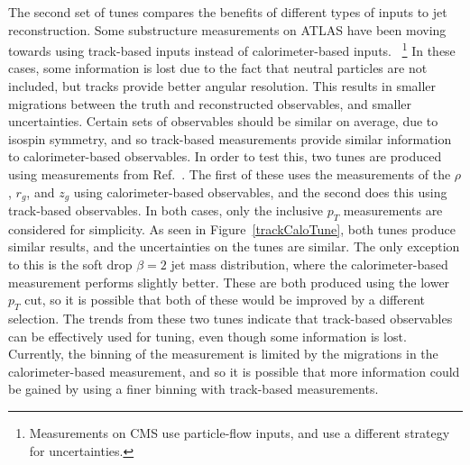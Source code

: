 The second set of tunes compares the benefits of different types of inputs to jet reconstruction.
Some substructure measurements on ATLAS have been moving towards using track-based inputs instead of calorimeter-based inputs.
~\footnote{Measurements on CMS use particle-flow inputs, and use a different strategy for uncertainties.} 
In these cases, some information is lost due to the fact that neutral particles are not included, but tracks provide better angular resolution.
This results in smaller migrations between the truth and reconstructed observables, and smaller uncertainties.
Certain sets of observables should be similar on average, due to isospin symmetry, and so track-based measurements provide similar information to calorimeter-based observables.
In order to test this, two tunes are produced using measurements from Ref.~\cite{softdropObservables}. The first of these uses the measurements of the $\rho$, $r_g$, and $z_g$
using calorimeter-based observables, and the second does this using track-based observables.
In both cases, only the inclusive $p_T$ measurements are considered for simplicity.
As seen in Figure~\ref{trackCaloTune}, both tunes produce similar results, and the uncertainties on the tunes are similar.
The only exception to this is the soft drop $\beta=2$ jet mass distribution, where the calorimeter-based measurement performs slightly better.
These are both produced using the lower $p_T$ cut, so it is possible that both of these would be improved by a different selection.
The trends from these two tunes indicate that track-based observables can be effectively used for tuning, even though some information is lost. 
Currently, the binning of the measurement is limited by the migrations in the calorimeter-based measurement, and so it is possible that more information could be gained by
using a finer binning with track-based measurements.




